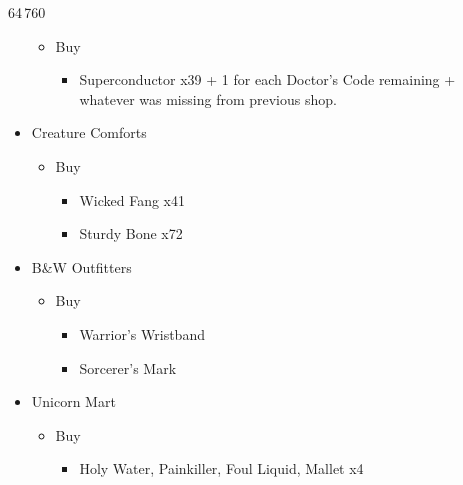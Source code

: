 \begin{multicols}{2}
\begin{shop}{64\,760}
\begin{itemize}
\begin{itemize}
\begin{itemize}
\begin{itemize}
            \end{itemize}
        \end{itemize}
        \item Buy
        \begin{itemize}
            \item Superconductor x39 + 1 for each Doctor's Code remaining + whatever was missing from previous shop.
        \end{itemize}
    \end{itemize}
    \item Creature Comforts
    \begin{itemize}
        \item Buy
        \begin{itemize}
            \item Wicked Fang x41
            \item Sturdy Bone x72
        \end{itemize}
    \end{itemize}
    \item B\&W Outfitters
    \begin{itemize}
        \item Buy
        \begin{itemize}
            \item Warrior's Wristband
            \item Sorcerer's Mark
        \end{itemize}
    \end{itemize}
    \item Unicorn Mart
    \begin{itemize}
        \item Buy
        \begin{itemize}
            \item Holy Water, Painkiller, Foul Liquid, Mallet x4
        \end{itemize}
    \end{itemize}
\end{itemize}
\end{shop}


\end{multicols}
